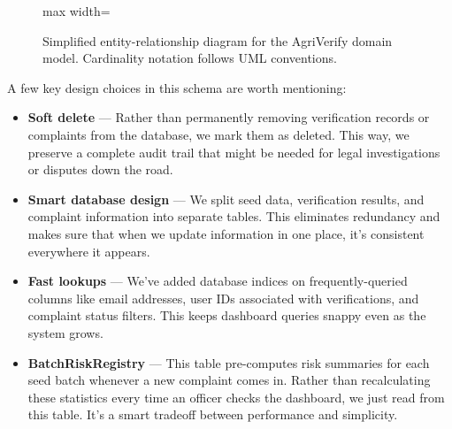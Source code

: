 \begin{figure}[htbp]
\begin{adjustbox}{max width=\textwidth}
  \end{adjustbox}
  \caption{Simplified entity-relationship diagram for the AgriVerify domain model. Cardinality notation follows UML conventions.}
  \label{fig:erd}
\end{figure}

\noindent
A few key design choices in this schema are worth mentioning:

\begin{itemize}
  \item \textbf{Soft delete} — Rather than permanently removing verification
        records or complaints from the database, we mark them as deleted. This way,
        we preserve a complete audit trail that might be needed for legal
        investigations or disputes down the road.

  \item \textbf{Smart database design} — We split seed data, verification results,
        and complaint information into separate tables. This eliminates redundancy
        and makes sure that when we update information in one place, it's consistent
        everywhere it appears.

  \item \textbf{Fast lookups} — We've added database indices on frequently-queried
        columns like email addresses, user IDs associated with verifications, and
        complaint status filters. This keeps dashboard queries snappy even as the
        system grows.

  \item \textbf{BatchRiskRegistry} — This table pre-computes risk summaries for
        each seed batch whenever a new complaint comes in. Rather than recalculating
        these statistics every time an officer checks the dashboard, we just read
        from this table. It's a smart tradeoff between performance and simplicity.
\end{itemize}